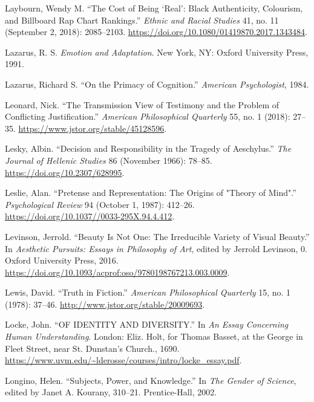 \documentclass[phdthesis,12pt,final]{wuthesis}
\newlength{\cslhangindent}
\newenvironment{CSLReferences}[2] %
{\begin{list}{}{%
	\setlength{\itemindent}{0pt}
	\setlength{\leftmargin}{0pt}
	\setlength{\parsep}{0pt}
	\ifodd #1
	\setlength{\leftmargin}{\cslhangindent}
	\setlength{\itemindent}{-1\cslhangindent}
	\fi
	\setlength{\itemsep}{#2\baselineskip}}}
{\end{list}}
\theoremstyle{definition}
\theoremstyle{definition}
\theoremstyle{definition}
\theoremstyle{definition}
\theoremstyle{remark}
\begin{document}
\begin{CSLReferences}{1}{0}
Laybourn, Wendy M. {``The Cost of Being {`Real'}: Black Authenticity, Colourism, and {Billboard Rap Chart} Rankings.''} \emph{Ethnic and Racial Studies} 41, no. 11 (September 2, 2018): 2085--2103. \url{https://doi.org/10.1080/01419870.2017.1343484}.

Lazarus, R. S. \emph{Emotion and Adaptation}. New York, NY: Oxford University Press, 1991.

Lazarus, Richard S. {``On the {Primacy} of {Cognition}.''} \emph{American Psychologist}, 1984.

Leonard, Nick. {``The {Transmission View} of {Testimony} and the {Problem} of {Conflicting Justification}.''} \emph{American Philosophical Quarterly} 55, no. 1 (2018): 27--35. \url{https://www.jstor.org/stable/45128596}.

Lesky, Albin. {``Decision and {Responsibility} in the {Tragedy} of {Aeschylus}.''} \emph{The Journal of Hellenic Studies} 86 (November 1966): 78--85. \url{https://doi.org/10.2307/628995}.

Leslie, Alan. {``Pretense and {Representation}: {The Origins} of "{Theory} of {Mind}".''} \emph{Psychological Review} 94 (October 1, 1987): 412--26. \url{https://doi.org/10.1037//0033-295X.94.4.412}.

Levinson, Jerrold. {``Beauty Is {Not One}: {The Irreducible Variety} of {Visual Beauty}.''} In \emph{Aesthetic {Pursuits}: {Essays} in {Philosophy} of {Art}}, edited by Jerrold Levinson, 0. Oxford University Press, 2016. \url{https://doi.org/10.1093/acprof:oso/9780198767213.003.0009}.

Lewis, David. {``Truth in {Fiction}.''} \emph{American Philosophical Quarterly} 15, no. 1 (1978): 37--46. \url{http://www.jstor.org/stable/20009693}.

Locke, John. {``{OF IDENTITY AND DIVERSITY}.''} In \emph{An {Essay Concerning Human Understanding}}. London: Eliz. Holt, for Thomas Basset, at the George in Fleet Street, near St. Dunstan's Church., 1690. \url{https://www.uvm.edu/~lderosse/courses/intro/locke_essay.pdf}.

Longino, Helen. {``Subjects, {Power}, and {Knowledge}.''} In \emph{The {Gender} of {Science}}, edited by Janet A. Kourany, 310--21. Prentice-Hall, 2002.


\end{CSLReferences}
\end{document}
